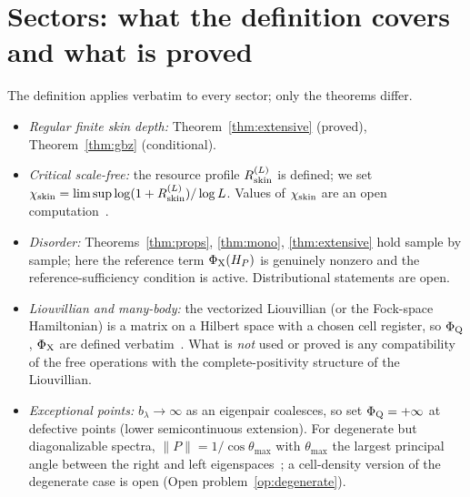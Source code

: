 \documentclass[11pt]{article}
\newcommand{\Rskin}{R_{\rm skin}}
\newcommand{\PhiQ}{\Phi_{\rm Q}}
\newcommand{\PhiX}{\Phi_{\rm X}}
\begin{document}
\section{Sectors: what the definition covers and what is proved}
The definition applies verbatim to every sector; only the theorems differ.
\begin{itemize}
\item \emph{Regular finite skin depth:} Theorem~\ref{thm:extensive} (proved), Theorem~\ref{thm:gbz} (conditional).
\item \emph{Critical scale-free:} the resource profile $\Rskin^{(L)}$ is defined; we set $\chi_{\rm skin}=\limsup\log(1+\Rskin^{(L)})/\log L$. Values of $\chi_{\rm skin}$ are an open computation~\cite{YokoMura,LiSun}.
\item \emph{Disorder:} Theorems~\ref{thm:props}, \ref{thm:mono}, \ref{thm:extensive} hold sample by sample; here the reference term $\PhiX(H_P)$ is genuinely nonzero and the reference-sufficiency condition is active. Distributional statements are open.
\item \emph{Liouvillian and many-body:} the vectorized Liouvillian (or the Fock-space Hamiltonian) is a matrix on a Hilbert space with a chosen cell register, so $\PhiQ$, $\PhiX$ are defined verbatim~\cite{SongYaoWang,ShimomuraSato}. What is \emph{not} used or proved is any compatibility of the free operations with the complete-positivity structure of the Liouvillian.
\item \emph{Exceptional points:} $b_\lambda\to\infty$ as an eigenpair coalesces, so set $\PhiQ=+\infty$ at defective points (lower semicontinuous extension). For degenerate but diagonalizable spectra, $\|P\|=1/\cos\theta_{\max}$ with $\theta_{\max}$ the largest principal angle between the right and left eigenspaces~\cite{IpsenMeyer}; a cell-density version of the degenerate case is open (Open problem~\ref{op:degenerate}).
\end{itemize}

\end{document}
